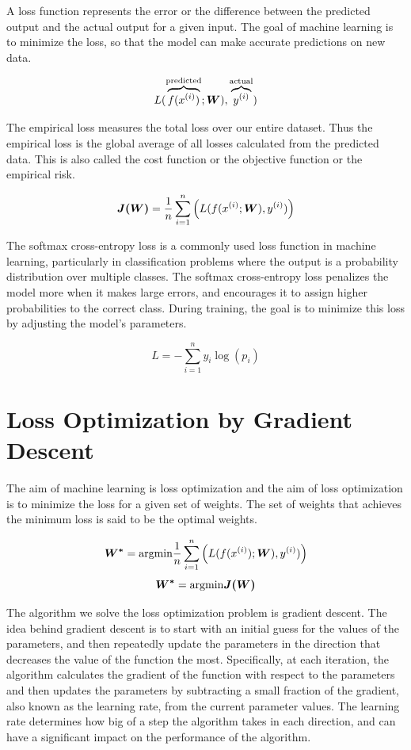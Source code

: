 \documentclass{report}
\begin{document}
A loss function represents the error or the difference between the predicted output and the actual output for a given input. The goal of machine learning is to minimize the loss, so that the model can make accurate predictions on new data.

$$L(\overbrace{f(x^{(i)})}^\textrm{predicted}; \boldsymbol{W}), \overbrace{y^{(i)}}^\textrm{actual})$$

The empirical loss measures the total loss over our entire dataset. Thus the empirical loss is the global average of all losses calculated from the predicted data. This is also called the cost function or the objective function or the empirical risk.

$$\boldsymbol{J(W)} = \frac{1}{n} \sum_{i=1}^n \left(L(f(x^{(i)}; \boldsymbol{W}), y^{(i)})\right)$$

The softmax cross-entropy loss is a commonly used loss function in machine learning, particularly in classification problems where the output is a probability distribution over multiple classes. The softmax cross-entropy loss penalizes the model more when it makes large errors, and encourages it to assign higher probabilities to the correct class. During training, the goal is to minimize this loss by adjusting the model's parameters.

$$L = - \sum\limits_{i=1}^n y_i \log(p_i)$$

\section{Loss Optimization by Gradient Descent}
The aim of machine learning is loss optimization and the aim of loss optimization is to minimize the loss for a given set of weights. The set of weights that achieves the minimum loss is said to be the optimal weights.

$$\boldsymbol{W^*} = \textrm{argmin} \frac{1}{n} \sum_{i = 1}^{n} \left( L(f(x^{(i)}); \boldsymbol{W}), y^{(i)}) \right)$$
$$\boldsymbol{W^*} = \textrm{argmin} \boldsymbol{J(W)}$$

The algorithm we solve the loss optimization problem is gradient descent. The idea behind gradient descent is to start with an initial guess for the values of the parameters, and then repeatedly update the parameters in the direction that decreases the value of the function the most. Specifically, at each iteration, the algorithm calculates the gradient of the function with respect to the parameters and then updates the parameters by subtracting a small fraction of the gradient, also known as the learning rate, from the current parameter values. The learning rate determines how big of a step the algorithm takes in each direction, and can have a significant impact on the performance of the algorithm.
\end{document}

